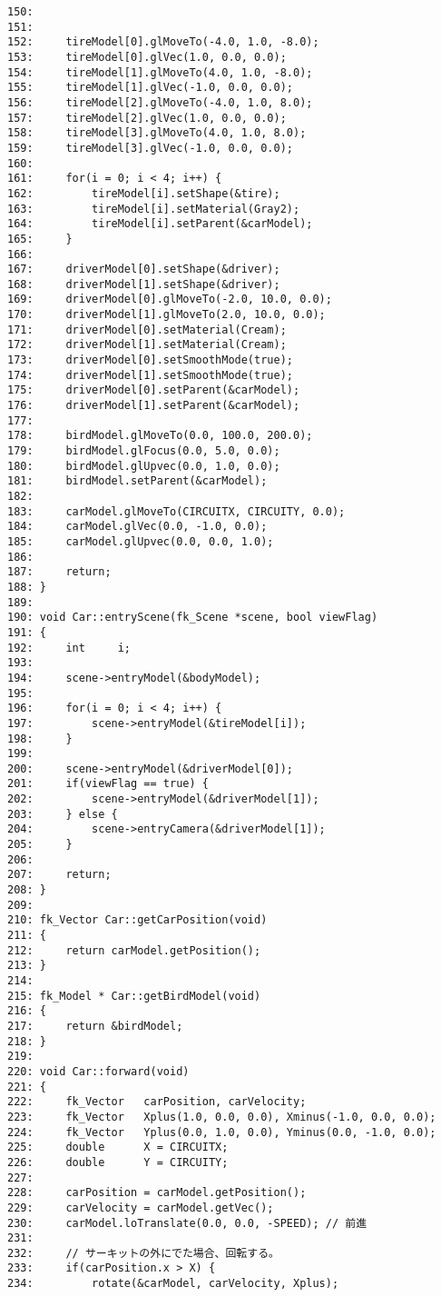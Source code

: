 \begin{breakbox}
\begin{verbatim}
150: 
151: 
152:     tireModel[0].glMoveTo(-4.0, 1.0, -8.0);
153:     tireModel[0].glVec(1.0, 0.0, 0.0);
154:     tireModel[1].glMoveTo(4.0, 1.0, -8.0);
155:     tireModel[1].glVec(-1.0, 0.0, 0.0);
156:     tireModel[2].glMoveTo(-4.0, 1.0, 8.0);
157:     tireModel[2].glVec(1.0, 0.0, 0.0);
158:     tireModel[3].glMoveTo(4.0, 1.0, 8.0);
159:     tireModel[3].glVec(-1.0, 0.0, 0.0);
160: 
161:     for(i = 0; i < 4; i++) {
162:         tireModel[i].setShape(&tire);
163:         tireModel[i].setMaterial(Gray2);
164:         tireModel[i].setParent(&carModel);
165:     }
166: 
167:     driverModel[0].setShape(&driver);
168:     driverModel[1].setShape(&driver);
169:     driverModel[0].glMoveTo(-2.0, 10.0, 0.0);
170:     driverModel[1].glMoveTo(2.0, 10.0, 0.0);
171:     driverModel[0].setMaterial(Cream);
172:     driverModel[1].setMaterial(Cream);
173:     driverModel[0].setSmoothMode(true);
174:     driverModel[1].setSmoothMode(true);
175:     driverModel[0].setParent(&carModel);
176:     driverModel[1].setParent(&carModel);
177: 
178:     birdModel.glMoveTo(0.0, 100.0, 200.0);
179:     birdModel.glFocus(0.0, 5.0, 0.0);
180:     birdModel.glUpvec(0.0, 1.0, 0.0);
181:     birdModel.setParent(&carModel);
182: 
183:     carModel.glMoveTo(CIRCUITX, CIRCUITY, 0.0);
184:     carModel.glVec(0.0, -1.0, 0.0);
185:     carModel.glUpvec(0.0, 0.0, 1.0);
186: 
187:     return;
188: }
189: 
190: void Car::entryScene(fk_Scene *scene, bool viewFlag)
191: {
192:     int     i;
193: 
194:     scene->entryModel(&bodyModel);
195: 
196:     for(i = 0; i < 4; i++) {
197:         scene->entryModel(&tireModel[i]);
198:     }
199: 
200:     scene->entryModel(&driverModel[0]);
201:     if(viewFlag == true) {
202:         scene->entryModel(&driverModel[1]);
203:     } else {
204:         scene->entryCamera(&driverModel[1]);
205:     }
206: 
207:     return;
208: }
209: 
210: fk_Vector Car::getCarPosition(void)
211: {
212:     return carModel.getPosition();
213: }
214: 
215: fk_Model * Car::getBirdModel(void)
216: {
217:     return &birdModel;
218: }
219: 
220: void Car::forward(void)
221: {
222:     fk_Vector   carPosition, carVelocity;
223:     fk_Vector   Xplus(1.0, 0.0, 0.0), Xminus(-1.0, 0.0, 0.0);
224:     fk_Vector   Yplus(0.0, 1.0, 0.0), Yminus(0.0, -1.0, 0.0);
225:     double      X = CIRCUITX;
226:     double      Y = CIRCUITY;
227: 
228:     carPosition = carModel.getPosition();
229:     carVelocity = carModel.getVec();
230:     carModel.loTranslate(0.0, 0.0, -SPEED); // 前進
231: 
232:     // サーキットの外にでた場合、回転する。
233:     if(carPosition.x > X) {
234:         rotate(&carModel, carVelocity, Xplus);

\end{verbatim}
\end{breakbox}
